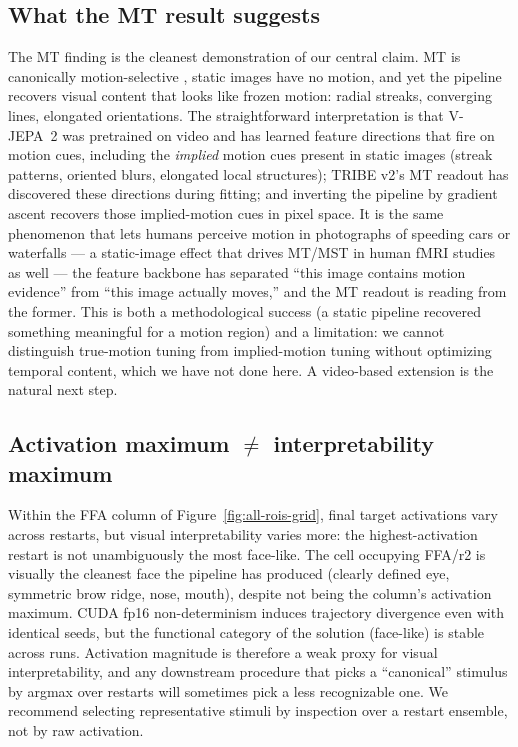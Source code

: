 \documentclass{article}
\begin{document}
\subsection{What the MT result suggests}
\label{sec:discussion-mt}
The MT finding is the cleanest demonstration of our central claim. MT is canonically motion-selective \citep{maunsell1983functional,born2005structure}, static images have no motion, and yet the pipeline recovers visual content that looks like frozen motion: radial streaks, converging lines, elongated orientations. The straightforward interpretation is that V-JEPA~2 was pretrained on video and has learned feature directions that fire on motion cues, including the \emph{implied} motion cues present in static images (streak patterns, oriented blurs, elongated local structures); TRIBE v2's MT readout has discovered these directions during fitting; and inverting the pipeline by gradient ascent recovers those implied-motion cues in pixel space. It is the same phenomenon that lets humans perceive motion in photographs of speeding cars or waterfalls --- a static-image effect that drives MT/MST in human fMRI studies as well \citep{kourtzi2000activation} --- the feature backbone has separated ``this image contains motion evidence'' from ``this image actually moves,'' and the MT readout is reading from the former. This is both a methodological success (a static pipeline recovered something meaningful for a motion region) and a limitation: we cannot distinguish true-motion tuning from implied-motion tuning without optimizing temporal content, which we have not done here. A video-based extension is the natural next step.

\subsection{Activation maximum $\neq$ interpretability maximum}
\label{sec:interp-gap}
Within the FFA column of Figure~\ref{fig:all-rois-grid}, final target activations vary across restarts, but visual interpretability varies more: the highest-activation restart is not unambiguously the most face-like. The cell occupying FFA/r2 is visually the cleanest face the pipeline has produced (clearly defined eye, symmetric brow ridge, nose, mouth), despite not being the column's activation maximum. CUDA fp16 non-determinism induces trajectory divergence even with identical seeds, but the functional category of the solution (face-like) is stable across runs. Activation magnitude is therefore a weak proxy for visual interpretability, and any downstream procedure that picks a ``canonical'' stimulus by argmax over restarts will sometimes pick a less recognizable one. We recommend selecting representative stimuli by inspection over a restart ensemble, not by raw activation.
\end{document}
